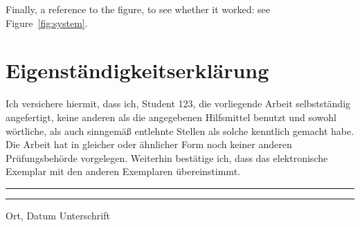 \documentclass[english,ngerman,paper=a5,headsepline=true,9pt,DIV=12,BCOR=0.7cm]{scrbook}
\newcommand{\authorstring}{Student 123} %
\begin{document}
Finally, a reference to the figure, to see whether it worked: see
Figure~\ref{fig:system}.

\chapter*{Eigenst\"{a}ndigkeitserkl\"{a}rung}
  Ich versichere hiermit, dass ich, \authorstring{}, die vorliegende
  Arbeit selbstst\"{a}ndig angefertigt, keine anderen als die
  an\-ge\-ge\-benen Hilfsmittel benutzt und sowohl w\"{o}rtliche, als auch
  sinngem\"{a}{\ss} entlehnte Stellen als solche kenntlich gemacht
  habe. Die Arbeit hat in gleicher oder \"{a}hnlicher Form noch keiner
  anderen Pr\"{u}fungsbeh\"{o}rde vorgelegen. Weiterhin best\"{a}tige ich, 
  dass das elektronische Exemplar mit den anderen Exemplaren \"{u}bereinstimmt.

\vspace{1cm}
\noindent{}\rule{0.39\textwidth}{0.4pt} \hspace{1.9cm} \rule{0.39\textwidth}{0.4pt}

\noindent{}Ort, Datum  \hspace{4.3cm} Unterschrift

%
% 
% 
% 
\end{document}
